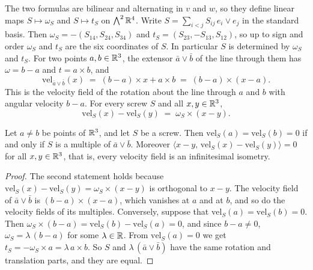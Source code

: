 The two formulas are bilinear and alternating in $v$ and $w$, so they
define linear maps $S \mapsto \omega_S$ and $S \mapsto t_S$ on
$\bigwedge^2 {\mathbb{R}}^4$. Write $S = \sum_{i < j} S_{ij}\, e_i \vee e_j$ in the
standard basis. Then $\omega_S = -(S_{14}, S_{24}, S_{34})$ and
$t_S = (S_{23}, -S_{13}, S_{12})$, so up to sign and order $\omega_S$
and $t_S$ are the six coordinates of $S$. In particular $S$ is
determined by $\omega_S$ and $t_S$. For two points $a, b \in {\mathbb{R}}^3$, the
extensor $\bar a \vee \bar b$ of the line through them has
$\omega = b - a$ and $t = a \times b$, and
\[
  \mathrm{vel}_{\bar a \vee \bar b}(x) \;=\; (b - a) \times x + a \times b
  \;=\; (b - a) \times (x - a).
\]
This is the velocity field of the rotation about the line through $a$
and $b$ with angular velocity $b - a$. For every screw $S$ and all
$x, y \in {\mathbb{R}}^3$,
\[
  \mathrm{vel}_S(x) - \mathrm{vel}_S(y) \;=\; \omega_S \times (x - y).
\]

\begin{lemma}
  \label{lem:screw-velocity-line}
  \leanok
  Let $a \neq b$ be points of ${\mathbb{R}}^3$, and let $S$ be a screw. Then
  $\mathrm{vel}_S(a) = \mathrm{vel}_S(b) = 0$ if and only if $S$ is a
  multiple of $\bar a \vee \bar b$. Moreover
  $\langle x - y,\, \mathrm{vel}_S(x) - \mathrm{vel}_S(y) \rangle = 0$
  for all $x, y \in {\mathbb{R}}^3$, that is, every velocity field is an
  infinitesimal isometry.
\end{lemma}
\begin{proof}
  \leanok
  The second statement holds because
  $\mathrm{vel}_S(x) - \mathrm{vel}_S(y) = \omega_S \times (x - y)$ is
  orthogonal to $x - y$. The velocity field of $\bar a \vee \bar b$ is
  $(b - a) \times (x - a)$, which vanishes at $a$ and at $b$, and so do
  the velocity fields of its multiples. Conversely, suppose that
  $\mathrm{vel}_S(a) = \mathrm{vel}_S(b) = 0$. Then
  $\omega_S \times (b - a) = \mathrm{vel}_S(b) - \mathrm{vel}_S(a) = 0$,
  and since $b - a \neq 0$, $\omega_S = \lambda\,(b - a)$ for some
  $\lambda \in {\mathbb{R}}$. From $\mathrm{vel}_S(a) = 0$ we get
  $t_S = -\omega_S \times a = \lambda\, a \times b$. So $S$ and
  $\lambda\,(\bar a \vee \bar b)$ have the same rotation and translation
  parts, and they are equal.
\end{proof}

